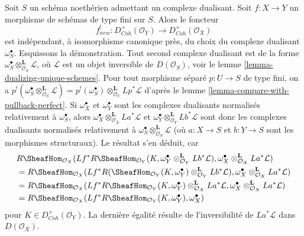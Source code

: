 \begin{remark}
\label{remark-independent-omega-S}
Soit $S$ un schéma noethérien admettant un complexe dualisant. Soit $f : X \to Y$ un morphisme de schémas de type fini sur $S$. Alors le foncteur
$$
f_{new}^! : D^+_{Coh}(\mathcal{O}_Y) \to D^+_{Coh}(\mathcal{O}_X)
$$
est indépendant, à isomorphisme canonique près, du choix du complexe dualisant $\omega_S^\bullet$. Esquissons la démonstration. Tout second complexe dualisant est de la forme $\omega_S^\bullet \otimes_{\mathcal{O}_S}^\mathbf{L} \mathcal{L}$, où $\mathcal{L}$ est un objet inversible de $D(\mathcal{O}_S)$, voir le lemme \ref{lemma-dualizing-unique-schemes}. Pour tout morphisme séparé $p : U \to S$ de type fini, on a
$p^!(\omega_S^\bullet \otimes^\mathbf{L}_{\mathcal{O}_S} \mathcal{L}) =
p^!(\omega_S^\bullet) \otimes^\mathbf{L}_{\mathcal{O}_U} Lp^*\mathcal{L}$
d'après le lemme \ref{lemma-compare-with-pullback-perfect}. Si $\omega_X^\bullet$ et $\omega_Y^\bullet$ sont les complexes dualisants normalisés relativement à $\omega_S^\bullet$, alors $\omega_X^\bullet \otimes_{\mathcal{O}_X}^\mathbf{L} La^*\mathcal{L}$ et $\omega_Y^\bullet \otimes_{\mathcal{O}_Y}^\mathbf{L} Lb^*\mathcal{L}$ sont donc les complexes dualisants normalisés relativement à $\omega_S^\bullet \otimes_{\mathcal{O}_S}^\mathbf{L} \mathcal{L}$ (où $a : X \to S$ et $b : Y \to S$ sont les morphismes structuraux). Le résultat s'en déduit, car
\begin{align*}
& R\SheafHom_{\mathcal{O}_X}(Lf^*R\SheafHom_{\mathcal{O}_Y}(K,
\omega_Y^\bullet \otimes_{\mathcal{O}_Y}^\mathbf{L} Lb^*\mathcal{L}),
\omega_X^\bullet \otimes_{\mathcal{O}_X}^\mathbf{L} La^*\mathcal{L}) \\
& = R\SheafHom_{\mathcal{O}_X}(Lf^*R(\SheafHom_{\mathcal{O}_Y}(K,
\omega_Y^\bullet) \otimes_{\mathcal{O}_Y}^\mathbf{L} Lb^*\mathcal{L}),
\omega_X^\bullet \otimes_{\mathcal{O}_X}^\mathbf{L} La^*\mathcal{L}) \\
& = R\SheafHom_{\mathcal{O}_X}(Lf^*R\SheafHom_{\mathcal{O}_Y}(K,
\omega_Y^\bullet) \otimes_{\mathcal{O}_X}^\mathbf{L} La^*\mathcal{L},
\omega_X^\bullet \otimes_{\mathcal{O}_X}^\mathbf{L} La^*\mathcal{L}) \\
& = R\SheafHom_{\mathcal{O}_X}(Lf^*R\SheafHom_{\mathcal{O}_Y}(K,
\omega_Y^\bullet), \omega_X^\bullet)
\end{align*}
pour $K \in D^+_{Coh}(\mathcal{O}_Y)$. La dernière égalité résulte de l'inversibilité de $La^*\mathcal{L}$ dans $D(\mathcal{O}_X)$.
\end{remark}


